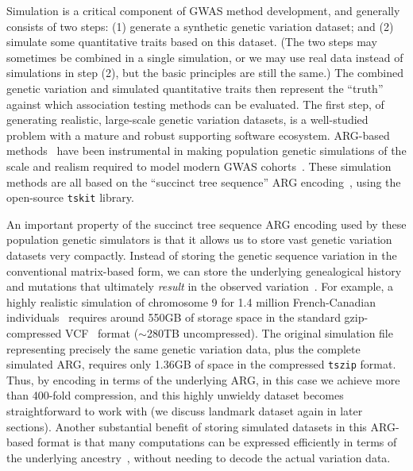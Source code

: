 \documentclass[unnumsec,webpdf,modern,large,namedate]{oup-authoring-template}%
\begin{document}
Simulation is a critical component of GWAS method development, and
generally consists of two steps: (1) generate a synthetic genetic
variation dataset; and (2) simulate some quantitative traits
based on this dataset.
(The two steps may sometimes be combined
in a single simulation, or we may use real data instead of simulations in
step (2), but the basic principles are still the same.)
The combined genetic variation and
simulated quantitative traits then represent the ``truth'' against
which association testing methods can be evaluated.
The first step, of generating realistic, large-scale genetic variation
datasets, is a well-studied problem with a mature and robust supporting
software ecosystem. ARG-based methods~\citep{kelleher2016efficient,
kelleher2018efficient,haller2018tree,adrion2020,baumdicker2022efficient,anderson2023}
have been instrumental in making population genetic simulations
of the scale and realism
required to model modern GWAS cohorts~\cite[e.g.][]{martin2017,zaidi2020}.
These simulation methods are all based on the ``succinct tree
sequence'' ARG encoding~\citep{kelleher2019,ralph2020,wong2023general},
using the open-source \texttt{tskit} library.

An important property of the succinct tree sequence ARG encoding
used by these population genetic simulators is that it allows us to
store vast genetic variation datasets very compactly. Instead of
storing the genetic sequence variation in the conventional
matrix-based form, we can store the underlying genealogical history
and mutations that ultimately \emph{result} in the observed
variation~\citep{kelleher2019}.
For example, a highly realistic simulation
of chromosome 9 for 1.4 million
French-Canadian individuals~\citep{anderson2023}
requires around 550GB of storage space in the
standard gzip-compressed VCF~\citep{danecek2011}
format ($\sim$280TB uncompressed).
The original simulation file representing
precisely the same genetic variation data, plus the
complete simulated ARG, requires only 1.36GB of space
in the compressed \texttt{tszip} format. Thus,
by encoding in terms of the underlying ARG,
in this case we achieve more than 400-fold compression,
and this highly unwieldy dataset
becomes straightforward to work with (we discuss
landmark dataset again in later sections).
Another substantial benefit of storing simulated datasets
in this ARG-based format is that many computations can
be expressed efficiently in terms of the underlying
ancestry~\citep{kelleher2016efficient,ralph2020}, without
needing to decode the actual variation data.
\end{document}
